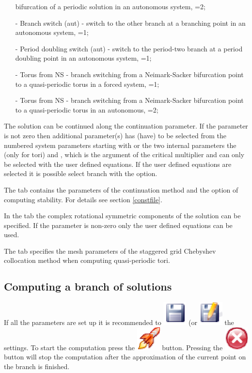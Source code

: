 \documentclass[10pt,a4paper]{ddedoc}
\def\iconRun{\includegraphics[scale=0.5]{fig/cr22-action-launch.eps}}
\def\iconStop{\includegraphics[scale=0.5]{fig/cr22-action-stop.eps}}
\def\iconSaveAs{\includegraphics[scale=0.5]{fig/cr22-action-filesaveas.eps}}
\def\iconSave{\includegraphics[scale=0.5]{fig/cr22-action-filesave.eps}}
\begin{document}
\begin{itemize}
bifurcation of a periodic solution in an autonomous system, =2;
\item[-] Branch switch (aut) - switch to the other branch at a branching point
in an autonomous system, =1;
\item[-] Period doubling switch (aut) - switch to the period-two branch at a
period doubling point in an autonomous system, =1;
\item[-] Torus from NS - branch switching from a Neimark-Sacker bifurcation
point to a quasi-periodic torus in a forced system, =1;
\item[-] Torus from NS - branch switching from a Neimark-Sacker bifurcation
point to a quasi-periodic torus in an autonomous, =2;
\end{itemize}
The solution can be continued along the  continuation parameter. If
the  parameter is not zero then additional parameter(s)
 has (have) to be selected from the numbered system parameters
starting with  or the two internal parameters the  (only for tori) and , which is the argument of the
critical multiplier and can only be selected with the user defined equations.
If the user defined equations are selected it is possible select branch with
the  option.

The  tab contains the parameters of the continuation method and
the option of computing stability. For details see section \ref{constfile}.

In the  tab the complex rotational symmetric components of the
solution can be specified. If the parameter  is non-zero only the
user defined equations can be used.

The  tab specifies the mesh parameters of the staggered grid
Chebyshev collocation method when computing quasi-periodic tori.

\subsection{Computing a branch of solutions}

If all the parameters are set up it is recommended to  \iconSave{}
(or  \iconSaveAs{} the settings. To start the computation
press the  \iconRun{} button. Pressing the  \iconStop{}
button will stop the computation after the approximation of the current point on
the branch is finished.
\end{document}

